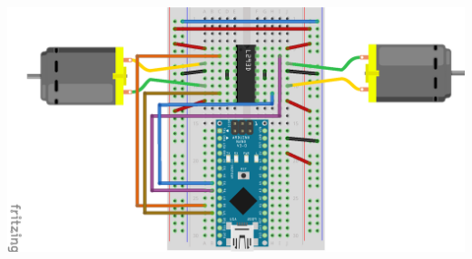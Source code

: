 \documentclass[../TinyBot.tex]{subfiles}
\begin{document}
\begin{center}
    \includegraphics[width=\textwidth]{resources/H-bridge-nano-without-battery_bb.png}
    \label{fig:schematic-hbridge-nobattery}
\end{center}
\end{document}

